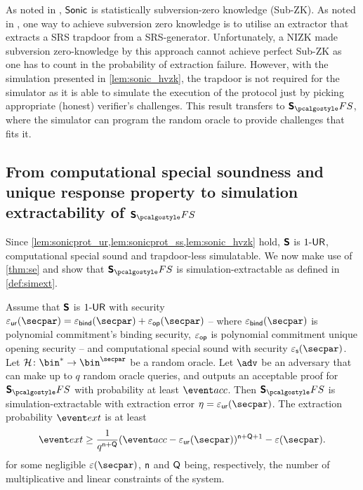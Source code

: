 \begin{remark} 
  As noted in \cite{CCS:MBKM19}, ${\textnormal{\textsf{Sonic}}}$ is statistically subversion-zero
  knowledge (Sub-ZK). As noted in \cite{AC:ABLZ17}, one way to achieve
  subversion zero knowledge is to utilise an extractor that extracts a SRS
  trapdoor from a SRS-generator. Unfortunately, a NIZK made subversion
  zero-knowledge by this approach cannot achieve perfect Sub-ZK as one has to
  count in the probability of extraction failure. However, with the simulation
  presented in \cref{lem:sonic_hvzk}, the trapdoor is not required for the
  simulator as it is able to simulate the execution of the protocol just by
  picking appropriate (honest) verifier's challenges. This result transfers to
  $\sonicprotfs$, where the simulator can program the random oracle to provide
  challenges that fits it.
\end{remark}

\subsection{From computational special soundness and unique response property to simulation extractability of $\sonicprotfs$}
Since \cref{lem:sonicprot_ur,lem:sonicprot_ss,lem:sonic_hvzk} hold, $\bm{\mathsf{S}}$ is ${1\text{-}\mathsf{UR}}$, computational special sound and trapdoor-less simulatable. We now make use
of \cref{thm:se} and show that $\sonicprotfs$ is simulation-extractable as defined in \cref{def:simext}.

\begin{corollary}
  \label{thm:sonicprotfs_se}
  Assume that $\bm{\mathsf{S}}$ is ${1\text{-}\mathsf{UR}}$ with security
  $\epsur(\secpar) = \epsbind(\secpar) + \epsop(\secpar)$ -- where
  $\epsbind (\secpar)$ is polynomial commitment's binding security, $\varepsilon_{\mathsf{op}}$ is
  polynomial commitment unique opening security -- and computational special sound with
  security $\epss(\secpar)$. Let $\ro\colon \bin^* \to \bin^\secpar$ be a
  random oracle. Let $\advse$ be an adversary that can make up to $q$
  random oracle queries, and outputs an
  acceptable proof for $\sonicprotfs$ with probability at least $\accProb$. Then
  $\sonicprotfs$ is simulation-extractable with extraction error
  $\eta = \epsur(\secpar)$. The extraction probability $\extProb$ is at least
\[
		\extProb  \geq \frac{1}{q^{\multconstr + \linconstr}} (\accProb - \epsur(\secpar))^{\multconstr +
		\linconstr + 1} - \eps(\secpar).
	\]
	for some negligible $\eps(\secpar)$, $\mathsf{n}$ and $\mathsf{Q}$ being,
  respectively, the number of multiplicative and linear constraints of the system.
\end{corollary}

